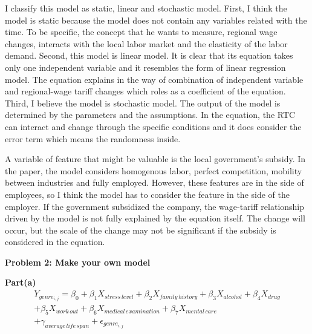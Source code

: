 \documentclass[letterpaper,12pt]{article}
\theoremstyle{definition}
\begin{document}
 \par 
I classify this model as static, linear and stochastic model. First, I think the model is static because the model does not contain any variables related with the time. To be specific, the concept that he wants to measure, regional wage changes, interacts with the local labor market and the elasticity of the labor demand.  Second, this model is linear model. It is clear that its equation takes only one independent variable and it resembles the form of linear regression model. The equation explains in the way of combination of independent variable and regional-wage tariff changes which roles as a coefficient of the equation. Third, I believe the model is stochastic model. The output of the model is determined by the parameters and the assumptions. In the equation, the RTC can interact and change through the specific conditions and it does consider the error term which means the randomness inside. 

\par
A variable of feature that might be valuable is the local government{'}s subsidy. In the paper, the model considers homogenous labor, perfect competition, mobility between industries and fully employed. However, these features are in the side of employees, so I think the model has to consider the feature in the side of the employer. If the government subsidized the company, the wage-tariff relationship driven by the model is not fully explained by the equation itself. The change will occur, but the scale of the change may not be significant if the subsidy is considered in the equation.  

 \newpage
 
 \noindent\textbf{Problem 2: Make your own model}

\textbf{Part(a)}            
\begin{multline}
Y_{genre_{i,j}} = \beta _{0}+\beta _{1}X_{stress\, level}+\beta _{2}X_{family\, history}+\beta _{3}X_{alcohol}+\beta _{4}X_{drug} \\
+\beta _{5}X_{work\, out}+\beta _{6}X_{medical\, examination}+\beta _{7}X_{mental\, care}\\
+\gamma _{average\, life\, span}+\epsilon_{genre_{i,j}}
\end{multline}
\end{document}

